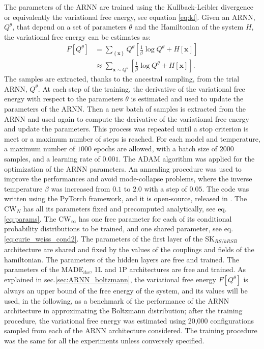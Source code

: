 \documentclass[aps,physrev,10pt,floatfix,reprint]{revtex4-2}
\begin{document}
The parameters of the ARNN are trained using the Kullback-Leibler divergence or equivalently the variational free energy, see equation \ref{eq:kl}. Given an ARNN, $Q^{\theta}$, that depend on a set of parameters $\theta$ and the Hamiltonian of the system $H$, the variational free energy can be estimates as:
\begin{align*}
F[Q^{\theta}] & = \sum_{\left\{ \mathbf{x} \right\}}Q^{\theta}\left[\frac{1}{\beta}\log Q^{\theta} + H[\mathbf{x}] \right]\\
& \approx \sum_{\mathbf{x} \sim Q^{\theta}} \left[ \frac{1}{\beta}\log Q^{\theta} + H[\mathbf{x}]\right].
\end{align*}
The samples are extracted, thanks to the ancestral sampling, from the trial ARNN, $Q^{\theta}$. At each step of the training, the derivative of the variational free energy with respect to the parameters $\theta$ is estimated and used to update the parameters of the ARNN. Then a new batch of samples is extracted from the ARNN and used again to compute the derivative of the variational free energy and update the parameters\cite{Wu2019}. This process was repeated until a stop criterion is meet or a maximum number of steps is reached. For each model and temperature, a maximum number of $1000$ epochs are allowed, with a batch size of $2000$ samples, and a learning rate of $0.001$. The ADAM algorithm\cite{kingma2014adam} was applied for the optimization of the ARNN parameters. An annealing procedure was used to improve the performances and avoid mode-collapse problems\cite{Wu2019}, where the inverse temperature $\beta$ was increased from $0.1$ to $2.0$ with a step of $0.05$. The code was written using the PyTorch framework\cite{NEURIPS2019_bdbca288}, and it is open-source, released in \cite{mygithub}.
The CW$_N$ has all its parameters fixed and precomputed analytically, see eq.\ref{eq:params}. The CW$_{\infty}$ has one free parameter for each of its conditional probability distributions to be trained, and one shared parameter, see eq.\ref{eq:curie_weiss_cond2}. The parameters of the first layer of the SK$_{RS/kRSB}$ architecture are shared and fixed by the values of the couplings and fields of the hamiltonian. The parameters of the hidden layers are free and trained. The parameters of the MADE$_{dw}$, 1L and 1P architectures are free and trained.
As explained in sec.\ref{sec:ARNN_boltzmann}, the variational free energy $F[Q^{\theta}]$ is always an upper bound of the free energy of the system, and its values will be used, in the following, as a benchmark of the performance of the ARNN architecture in approximating the Boltzmann distribution; after the training procedure, the variational free energy was estimated using 20,000 configurations sampled from each of the ARNN architecture considered. 
The training procedure was the same for all the experiments unless conversely specified.
\end{document}
